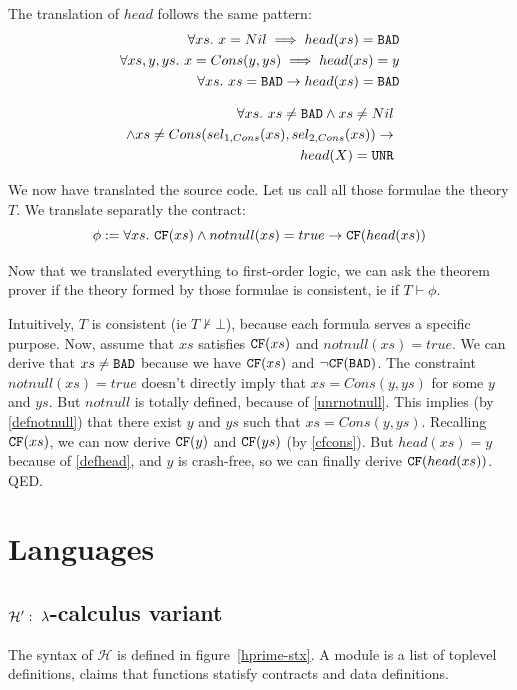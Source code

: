 \documentclass[preprint]{sigplanconf}
\begin{document}
The translation of $head$ follows the same pattern:
\begin{align}
  \forall xs.~ x=Nil \implies head(xs) = \texttt{BAD} \notag\\
  \forall xs,y,ys.~ x=Cons(y,ys) \implies head(xs) = y     \label{defhead} \\
    \forall xs.~xs=\texttt{BAD} \to head(xs) = \texttt{BAD} \notag
\end{align}

\begin{align*}
 \forall xs.~xs \neq \texttt{BAD} \land xs \neq Nil \notag \\
 \land xs \neq Cons(sel_{1,Cons}(xs),sel_{2,Cons}(xs)) \to  \notag \\
 head(X) = \texttt{UNR} 
\end{align*}

We now have translated the source code. Let us call all those formulae
the theory $T$. We translate separatly the contract:
\begin{equation*}
  \phi := \forall xs.~\texttt{CF}(xs) \land notnull(xs) = true \to \texttt{CF}(head(xs)) 
\end{equation*}

Now that we translated everything to first-order logic, we can ask the
theorem prover if the theory formed by those formulae is
consistent, ie if $T \vdash \phi$.

Intuitively, $T$ is consistent (ie $T \not \vdash \bot$), because each
formula serves a specific purpose. Now, assume that $xs$ satisfies
$\texttt{CF}(xs)$ and $notnull(xs) = true$.  We can derive that $xs \neq \texttt{BAD}$
because we have $\texttt{CF}(xs)$ and $\lnot \texttt{CF}(\texttt{BAD})$. The constraint
$notnull(xs) = true$ doesn't directly imply that $xs = Cons(y,ys)$ for
some $y$ and $ys$. But $notnull$ is totally defined, because of
\eqref{unrnotnull}. This implies (by \eqref{defnotnull}) that there exist
$y$ and $ys$ such that $xs = Cons(y,ys)$. Recalling $\texttt{CF}(xs)$, we can
now derive $\texttt{CF}(y)$ and $\texttt{CF}(ys)$ (by \eqref{cfcons}). But $head(xs) =
y$ because of \eqref{defhead}, and $y$ is crash-free, so we can finally
derive $\texttt{CF}(head(xs))$. QED.


\section{Languages}
\subsection{$\mathcal{H}':~\lambda$-calculus variant}

The syntax of $\mathcal{H}$ is defined in figure~\ref{hprime-stx}. A module
is a list of toplevel definitions, claims that functions statisfy
contracts and data definitions.
\end{document}
